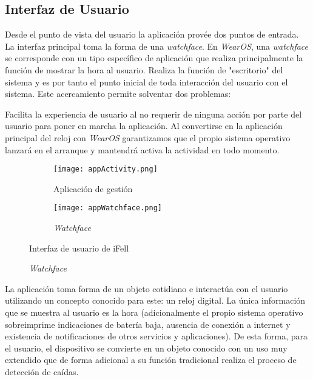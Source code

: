 \subsection{Interfaz de Usuario}
Desde el punto de vista del usuario la aplicación provée dos puntos de entrada. La interfaz principal toma la forma de una \textit{watchface}. En \textit{WearOS}, una \textit{watchface} se corresponde con un tipo específico de aplicación que realiza principalmente la función de mostrar la hora al usuario. Realiza la función de "escritorio" del sistema y es por tanto el punto inicial de toda interacción del usuario con el sistema. Este acercamiento permite solventar dos problemas:

Facilita la experiencia de usuario al no requerir de ninguna acción por parte del usuario para poner en marcha la aplicación. Al convertirse en la aplicación principal del reloj con  \textit{WearOS} garantizamos que el propio sistema operativo lanzará en el arranque y mantendrá activa la actividad en todo momento.

\begin{figure}[!ht]
  \centering
  \begin{subfigure}[b]{0.4\textwidth}
      \centering
      \texttt{[image: appActivity.png]}
      \caption{Aplicación de gestión}
      \label{fig:uiActivity}
  \end{subfigure}
  \hfill
  \begin{subfigure}[b]{0.4\textwidth}
      \centering
      \texttt{[image: appWatchface.png]}
      \caption{\textit{Watchface}}
      \label{fig:uiWatchface}
  \end{subfigure}
  \caption{\label{fig:ifell:UI} Interfaz de usuario de iFell}
\iffalse
\subfloat{\label{fig:uiActivity} Aplicación de gestión}{\texttt{[image: appActivity.png]}}
     \caption{\label{fig:uiApps} Interfaces de usuario}
     \hfill
\subfloat{\label{fig:uiWatchface} Watchface}{\texttt{[image: appWatchface.png]}}
\fi
\end{figure}


La aplicación toma forma de un objeto cotidiano e interactúa con el usuario utilizando un concepto conocido para este: un reloj digital. La única información que se muestra al usuario es la hora (adicionalmente el propio sistema operativo sobreimprime indicaciones de batería baja, ausencia de conexión a internet y existencia de notificaciones de otros servicios y aplicaciones). De esta forma, para el usuario, el dispositivo se convierte en un objeto conocido con un uso muy extendido que de forma adicional a su función tradicional realiza el proceso de detección de caídas.

